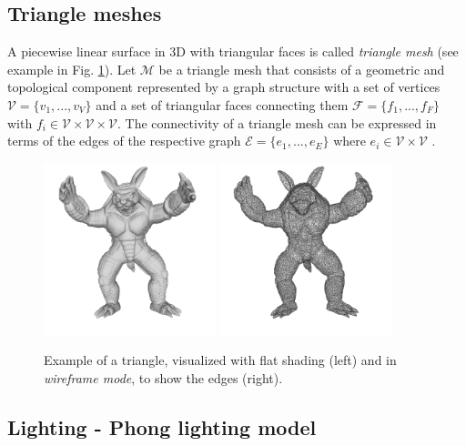\subsection{Triangle meshes}
A piecewise linear surface in 3D with triangular faces is called \textit{triangle mesh} (see example in Fig. \ref{fig:mesh-3d-armadillo}). Let $\mathcal{M}$ be a triangle mesh that consists of a geometric and topological component represented by a graph structure with a set of vertices $\mathcal{V} = \{ v_1, ..., v_V \}$ and a set of triangular faces connecting them $\mathcal{F} = \{ f_1, ... , f_F \}$ with $f_i \in \mathcal{V} \times \mathcal{V} \times \mathcal{V}$. The connectivity of a triangle mesh can be expressed in terms of the edges of the respective graph $\mathcal{E} = \{ e_1, ..., e_E \}$ where $e_i \in \mathcal{V} \times \mathcal{V}$ \cite{polygonmeshprocessing}.
\begin{figure}[h!]
  \centering
  \centering
  \includegraphics[width=5cm]{images/armadillo-white04}
  \endminipage
  \centering
  \centering
  \includegraphics[width=5cm]{images/armadillo-white205}
  \endminipage
\caption{Example of a triangle, visualized with flat shading (left) and in \emph{wireframe mode}, to show the edges (right).}\label{fig:mesh-3d-armadillo}
\end{figure}


\subsection{Lighting - Phong lighting model}

